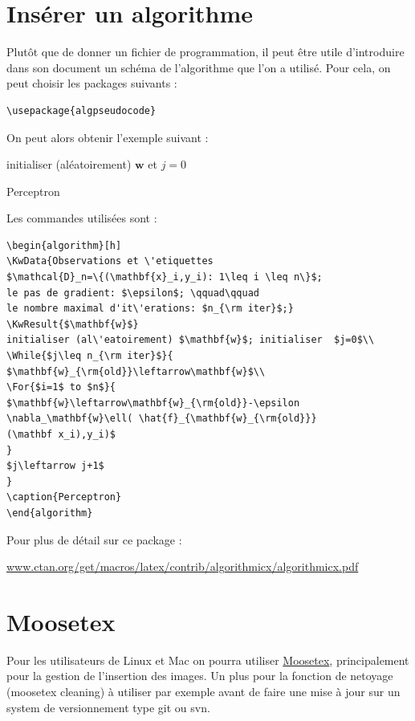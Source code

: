 \section{Insérer un algorithme}
Plutôt que de donner un fichier de programmation, il peut être utile d'introduire dans son document
 un schéma de l'algorithme que l'on a utilisé. Pour cela, on peut choisir les packages suivants :\medskip

\begin{lstlisting}
\usepackage{algpseudocode}
\end{lstlisting}

On peut alors obtenir  l'exemple suivant :\medskip 


\begin{algorithm}[h]
initialiser (aléatoirement) $\mathbf{w}$ et  $j=0$\\
\caption{Perceptron}
\end{algorithm}

Les commandes utilisées sont : 

\begin{lstlisting}
\begin{algorithm}[h]
\KwData{Observations et \'etiquettes 
$\mathcal{D}_n=\{(\mathbf{x}_i,y_i): 1\leq i \leq n\}$;
le pas de gradient: $\epsilon$; \qquad\qquad 
le nombre maximal d'it\'erations: $n_{\rm iter}$;}
\KwResult{$\mathbf{w}$}
initialiser (al\'eatoirement) $\mathbf{w}$; initialiser  $j=0$\\
\While{$j\leq n_{\rm iter}$}{
$\mathbf{w}_{\rm{old}}\leftarrow\mathbf{w}$\\
\For{$i=1$ to $n$}{
$\mathbf{w}\leftarrow\mathbf{w}_{\rm{old}}-\epsilon 
\nabla_\mathbf{w}\ell( \hat{f}_{\mathbf{w}_{\rm{old}}}
(\mathbf x_i),y_i)$
}
$j\leftarrow j+1$
}
\caption{Perceptron}
\end{algorithm}
\end{lstlisting}


\noindent Pour plus de détail sur ce package :

\noindent\url{www.ctan.org/get/macros/latex/contrib/algorithmicx/algorithmicx.pdf}


\section{Moosetex}

Pour les utilisateurs de Linux et Mac on pourra utiliser 
\href{http://www.math.u-bordeaux1.fr/~cdeledal/moosetex}{Moosetex},
principalement pour la gestion de l'insertion des images.
Un plus pour la fonction de netoyage (moosetex cleaning) \`a utiliser par exemple
avant de faire une mise \`a jour sur un system de versionnement type git ou svn.
